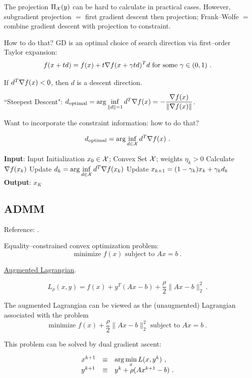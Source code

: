 The projection $\Pi_{\mathcal X}(y)$ can be hard to calculate in practical cases.
However, subgradient projection $=$ first gradient descent then projection;
Frank--Wolfe $=$ combine gradient descent with projection to constraint.

How to do that? GD is an optimal choice of search direction via first--order Taylor expansion:
$$f(x+td)=f(x)+t\nabla f(x+\gamma td)^Td \text{ for some } \gamma\in (0,1) \ .$$

If $d^T\nabla f(x)<0$, then $d$ is a descent direction.

``Steepest Descent": $d_{\text{optimal}}=\arg\inf\limits_{\|d\|=1}d^T \nabla f(x)=-\dfrac{\nabla f(x)}{\|\nabla f(x)\|}$.

Want to incorporate the constraint information: how to do that?

$$d_{\text{optimal}}=\arg\inf\limits_{d\in \mathcal X}d^T \nabla f(x) \ .$$

\begin{algorithm}[H]
\caption{Frank--Wolfe Method}
\label{Alg:Frank-Wolfe}
\begin{algorithmic}[1]
\STATE \textbf{Input}: Input Initialization $x_0\in \mathcal X$; Convex Set $\mathcal X$; weights $\eta_k>0$
    \STATE Calculate $\nabla f(x_k)$
    \STATE Update $d_k=\arg\inf\limits_{d\in \mathcal X}d^T\nabla f(x_k)$
    \STATE Update $x_{k+1}=(1-\gamma_k)x_k+\gamma_k d_k$
\ENDFOR
\STATE \textbf{Output}: $x_K$
\end{algorithmic}
\end{algorithm}

\subsection{ADMM}

Reference: \cite{BoydEtAlADMMpaper}.

Equality--constrained convex optimization problem:
$$\text{minimize } f(x) \text{ subject to } Ax=b \ .$$

\underline{Augmented Lagrangian}. 

$$L_{\rho}(x,y)=f(x)+y^T(Ax-b)+\dfrac{\rho}{2}\|Ax-b\|_2^2 \ .$$

The augmented Lagrangian can be viewed as the (unaugmented) Lagrangian associated 
with the problem
$$\text{minimize } f(x)+\dfrac{\rho}{2}\|Ax-b\|_2^2 \text{ subject to } Ax=b \ .$$

This problem can be solved by dual gradient ascent: 

$$\begin{array}{lll}
x^{k+1} & \equiv & \arg\min\limits_{x} L(x, y^k) \ , \\
y^{k+1} & \equiv & y^k+\rho (Ax^{k+1}-b) \ .
\end{array}$$



